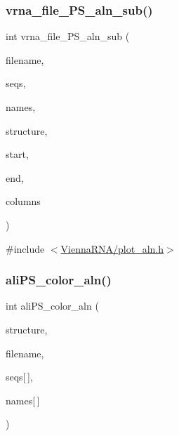 \subsubsection{\texorpdfstring{vrna\+\_\+file\+\_\+\+P\+S\+\_\+aln\+\_\+sub()}{vrna\_file\_PS\_aln\_sub()}}
{\footnotesize\ttfamily int vrna\+\_\+file\+\_\+\+P\+S\+\_\+aln\+\_\+sub (\begin{DoxyParamCaption}\item[{const char $\ast$}]{filename,  }\item[{const char $\ast$$\ast$}]{seqs,  }\item[{const char $\ast$$\ast$}]{names,  }\item[{const char $\ast$}]{structure,  }\item[{int}]{start,  }\item[{int}]{end,  }\item[{int}]{columns }\end{DoxyParamCaption})}



{\ttfamily \#include $<$\mbox{\hyperlink{plot__aln_8h}{Vienna\+R\+N\+A/plot\+\_\+aln.\+h}}$>$}

\mbox{\label{group__plotting__utils_gaab48d4dac655d688abe921389ac2847c}} 
\subsubsection{\texorpdfstring{ali\+P\+S\+\_\+color\+\_\+aln()}{aliPS\_color\_aln()}}
{\footnotesize\ttfamily int ali\+P\+S\+\_\+color\+\_\+aln (\begin{DoxyParamCaption}\item[{const char $\ast$}]{structure,  }\item[{const char $\ast$}]{filename,  }\item[{const char $\ast$}]{seqs\mbox{[}$\,$\mbox{]},  }\item[{const char $\ast$}]{names\mbox{[}$\,$\mbox{]} }\end{DoxyParamCaption})}



